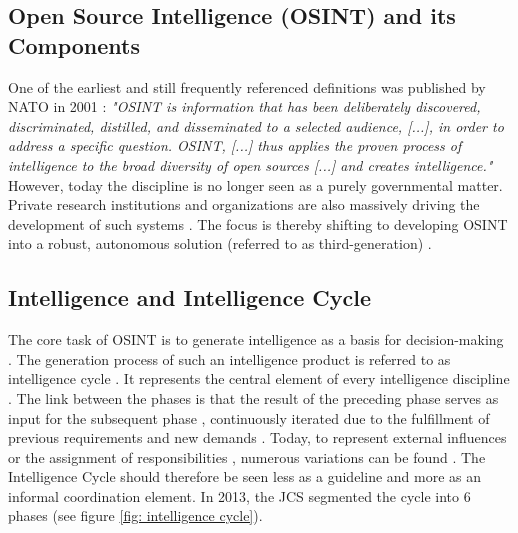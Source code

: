\documentclass[10pt]{article}
\begin{document}
\subsection{Open Source Intelligence (OSINT) and its Components}

One of the earliest and still frequently referenced definitions \cite{DosPassos.2017}
was published by NATO in 2001 \cite{NorthAtlanticTreatyOrganization.2001}: \textit{"OSINT is information that has been
    deliberately discovered, discriminated, distilled, and disseminated to a selected audience,
    [...], in order to address a specific question. OSINT, [...] thus applies the proven
    process of intelligence to the broad diversity of open sources [...] and creates
    intelligence."} However, today the discipline is no longer seen as a purely governmental
matter. Private research institutions and organizations \cite{Bohm.2021,Mercado.2005} are
also massively driving the development of such systems
\cite{Dokman.2020, Ghioni.2023}. The focus is thereby shifting to
developing OSINT into a robust, autonomous solution (referred to as third-generation) \cite{PastorGalindo.2019}.

\subsection{Intelligence and Intelligence Cycle}

The core task of OSINT is to generate intelligence
as a basis for decision-making
\cite{Breakspear.2013,NorthAtlanticTreatyOrganization.2001}. The generation process of such an intelligence product
is referred to as intelligence cycle \cite{CentralIntelligenceAgency.1987}.
It represents the central element of every intelligence discipline \cite{Reuser.2017}. The link between the phases is that
the result of the preceding phase serves as input for the subsequent phase
\cite{JointChiefsofStaffU.S.Army.2013}, continuously
iterated due to the fulfillment of previous requirements and new demands \cite{Gibson.2016}.
Today, to represent external influences or the
assignment of responsibilities \cite{Lowenthal.2020,Phythian.2013}, numerous
variations can be found \cite{Reuser.2017}. The
Intelligence Cycle should therefore be seen less as a guideline and more as an informal
coordination element\cite{Hwang.2022}.
In 2013, the JCS segmented the cycle into 6 phases \cite{JointChiefsofStaffU.S.Army.2013} (see figure \ref{fig: intelligence cycle}).
\end{document}
